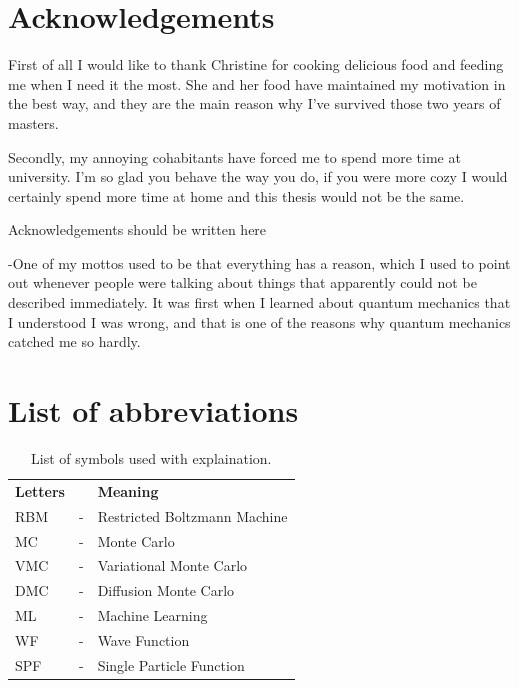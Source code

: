 \thispagestyle{empty}
\clearpage

\thispagestyle{empty}
\clearpage

\section*{Acknowledgements}
First of all I would like to thank Christine for cooking delicious food and feeding me when I need it the most. She and her food have maintained my motivation in the best way, and they are the main reason why I've survived those two years of masters. 

Secondly, my annoying cohabitants have forced me to spend more time at university. I'm so glad you behave the way you do, if you were more cozy I would certainly spend more time at home and this thesis would not be the same.
\vspace{10cm}

    Acknowledgements should be written here
    
    -One of my mottos used to be that everything has a reason, which I used to point out whenever people were talking about things that apparently could not be described immediately. It was first when I learned about quantum mechanics that I understood I was wrong, and that is one of the reasons why quantum mechanics catched me so hardly. 
    
\thispagestyle{empty}
\clearpage

{%
    \tableofcontents
    \thispagestyle{empty}
    \clearpage}%

\thispagestyle{empty}
\clearpage

\section*{List of abbreviations}
\begin{table}[H]
    \centering
    \begin{tabular}{lcl}
        \textbf{Letters} & & \textbf{Meaning} \\
        RBM & - & Restricted Boltzmann Machine \\
        MC & - & Monte Carlo \\
        VMC & - & Variational Monte Carlo \\
        DMC & - & Diffusion Monte Carlo \\
        ML & - & Machine Learning \\
        WF & - & Wave Function \\
        SPF & - & Single Particle Function \\

    \end{tabular}
    \caption{List of symbols used with explaination.}
    \label{tab:symbols}
\end{table}

